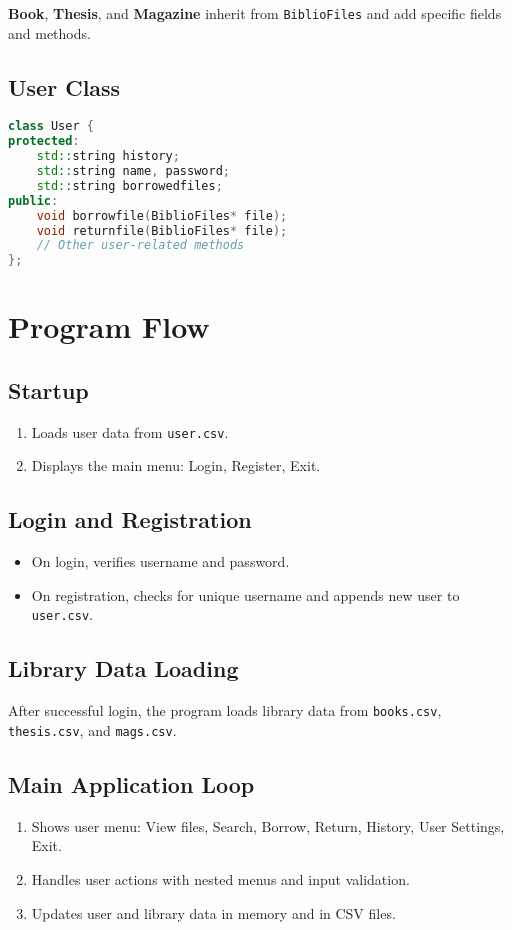 \documentclass[a4paper,12pt]{article}
\begin{document}
\textbf{Book}, \textbf{Thesis}, and \textbf{Magazine} inherit from \texttt{BiblioFiles} and add specific fields and methods.

\subsection{User Class}
\begin{lstlisting}[language=C++, caption={User Class}]
class User {
protected:
    std::string history;
    std::string name, password;
    std::string borrowedfiles;
public:
    void borrowfile(BiblioFiles* file);
    void returnfile(BiblioFiles* file);
    // Other user-related methods
};
\end{lstlisting}

\section{Program Flow}

\subsection{Startup}
\begin{enumerate}
    \item Loads user data from \texttt{user.csv}.
    \item Displays the main menu: Login, Register, Exit.
\end{enumerate}

\subsection{Login and Registration}
\begin{itemize}
    \item On login, verifies username and password.
    \item On registration, checks for unique username and appends new user to \texttt{user.csv}.
\end{itemize}

\subsection{Library Data Loading}
After successful login, the program loads library data from \texttt{books.csv}, \texttt{thesis.csv}, and \texttt{mags.csv}.

\subsection{Main Application Loop}
\begin{enumerate}
    \item Shows user menu: View files, Search, Borrow, Return, History, User Settings, Exit.
    \item Handles user actions with nested menus and input validation.
    \item Updates user and library data in memory and in CSV files.
\end{enumerate}
\end{document}

